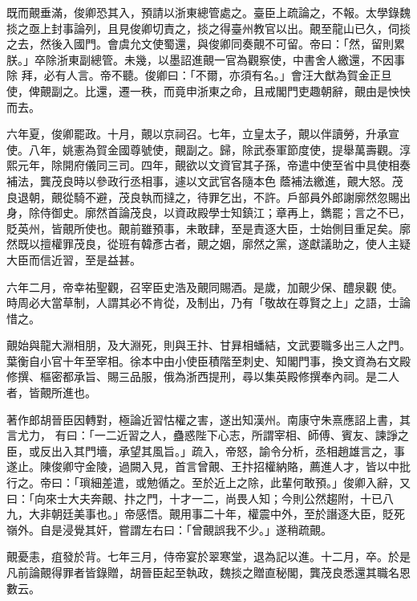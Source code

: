 \begin{pinyinscope}
 既而覿垂滿，俊卿恐其入，預請以浙東總管處之。臺臣上疏論之，不報。太學錄魏掞之亟上封事論列，且見俊卿切責之，掞之得臺州教官以出。覿至龍山已久，伺掞之去，然後入國門。會虞允文使蜀還，與俊卿同奏覿不可留。帝曰：「然，留則累朕。」卒除浙東副總管。未幾，以墨詔進覿一官為觀察使，中書舍人繳還，不因事除
 拜，必有人言。帝不聽。俊卿曰：「不爾，亦須有名。」會汪大猷為賀金正旦使，俾覿副之。比還，遷一秩，而竟申浙東之命，且戒閣門吏趣朝辭，覿由是怏怏而去。



 六年夏，俊卿罷政。十月，覿以京祠召。七年，立皇太子，覿以伴讀勞，升承宣使。八年，姚憲為賀金國尊號使，覿副之。歸，除武泰軍節度使，提舉萬壽觀。淳熙元年，除開府儀同三司。四年，覿欲以文資官其子孫，帝遣中使至省中具使相奏補法，龔茂良時以參政行丞相事，遽以文武官各隨本色
 蔭補法繳進，覿大怒。茂良退朝，覿從騎不避，茂良執而撻之，待罪乞出，不許。戶部員外郎謝廓然忽賜出身，除侍御史。廓然首論茂良，以資政殿學士知鎮江；章再上，鐫罷；言之不已，貶英州，皆覿所使也。覿前雖預事，未敢肆，至是責逐大臣，士始側目重足矣。廓然既以擅權罪茂良，從班有韓彥古者，覿之姻，廓然之黨，遂獻議助之，使人主疑大臣而信近習，至是益甚。



 六年二月，帝幸祐聖觀，召宰臣史浩及覿同賜酒。是歲，加覿少保、醴泉觀
 使。時周必大當草制，人謂其必不肯從，及制出，乃有「敬故在尊賢之上」之語，士論惜之。



 覿始與龍大淵相朋，及大淵死，則與王抃、甘昪相蟠結，文武要職多出三人之門。葉衡自小官十年至宰相。徐本中由小使臣積階至刺史、知閣門事，換文資為右文殿修撰、樞密都承旨、賜三品服，俄為浙西提刑，尋以集英殿修撰奉內祠。是二人者，皆覿所進也。



 著作郎胡晉臣因轉對，極論近習怙權之害，遂出知漢州。南康守朱熹應詔上書，其言尤力，
 有曰：「一二近習之人，蠱惑陛下心志，所謂宰相、師傅、賓友、諫諍之臣，或反出入其門墻，承望其風旨。」疏入，帝怒，諭令分析，丞相趙雄言之，事遂止。陳俊卿守金陵，過闕入見，首言曾覿、王抃招權納賂，薦進人才，皆以中批行之。帝曰：「瑣細差遣，或勉循之。至於近上之除，此輩何敢預。」俊卿入辭，又曰：「向來士大夫奔覿、抃之門，十才一二，尚畏人知；今則公然趨附，十已八九，大非朝廷美事也。」帝感悟。覿用事二十年，權震中外，至於譖逐大臣，貶死
 嶺外。自是浸覺其奸，嘗謂左右曰：「曾覿誤我不少。」遂稍疏覿。



 覿憂恚，疽發於背。七年三月，侍帝宴於翠寒堂，退為記以進。十二月，卒。於是凡前論覿得罪者皆錄贈，胡晉臣起至執政，魏掞之贈直秘閣，龔茂良悉還其職名恩數云。




\end{pinyinscope}
